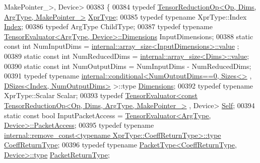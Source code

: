\begin{DoxyCode}
      MakePointer\_>, Device>
00383 \{
00384   \textcolor{keyword}{typedef} \hyperlink{class_eigen_1_1_tensor_reduction_op}{TensorReductionOp<Op, Dims, ArgType, MakePointer\_>}
       \hyperlink{class_eigen_1_1_tensor_reduction_op}{XprType};
00385   \textcolor{keyword}{typedef} \textcolor{keyword}{typename} XprType::Index \hyperlink{namespace_eigen_a62e77e0933482dafde8fe197d9a2cfde}{Index};
00386   \textcolor{keyword}{typedef} ArgType ChildType;
00387   \textcolor{keyword}{typedef} \textcolor{keyword}{typename} \hyperlink{struct_eigen_1_1_tensor_evaluator}{TensorEvaluator<ArgType, Device>::Dimensions}
       InputDimensions;
00388   \textcolor{keyword}{static} \textcolor{keyword}{const} \textcolor{keywordtype}{int} NumInputDims = \hyperlink{struct_eigen_1_1internal_1_1array__size}{internal::array\_size<InputDimensions>::value}
      ;
00389   \textcolor{keyword}{static} \textcolor{keyword}{const} \textcolor{keywordtype}{int} NumReducedDims = \hyperlink{struct_eigen_1_1internal_1_1array__size}{internal::array\_size<Dims>::value};
00390   \textcolor{keyword}{static} \textcolor{keyword}{const} \textcolor{keywordtype}{int} NumOutputDims = NumInputDims - NumReducedDims;
00391   \textcolor{keyword}{typedef} \textcolor{keyword}{typename} \hyperlink{struct_eigen_1_1internal_1_1conditional}{internal::conditional<NumOutputDims==0, Sizes<>}
      , \hyperlink{struct_eigen_1_1_d_sizes}{DSizes<Index, NumOutputDims>} >::type \hyperlink{class_eigen_1_1internal_1_1_tensor_lazy_evaluator_writable}{Dimensions};
00392   \textcolor{keyword}{typedef} \textcolor{keyword}{typename} XprType::Scalar Scalar;
00393   \textcolor{keyword}{typedef} 
      \hyperlink{struct_eigen_1_1_tensor_evaluator}{TensorEvaluator<const TensorReductionOp<Op, Dims, ArgType, MakePointer\_>}
      , Device> \hyperlink{struct_eigen_1_1_tensor_evaluator_3_01const_01_tensor_reduction_op_3_01_op_00_01_dims_00_01_arg_4fdf2ec1445de4704eb590bc98040dc6}{Self};
00394   \textcolor{keyword}{static} \textcolor{keyword}{const} \textcolor{keywordtype}{bool} InputPacketAccess = 
      \hyperlink{struct_eigen_1_1_tensor_evaluator}{TensorEvaluator<ArgType, Device>::PacketAccess};
00395   \textcolor{keyword}{typedef} \textcolor{keyword}{typename} 
      \hyperlink{group___sparse_core___module}{internal::remove\_const<typename XprType::CoeffReturnType>::type}
       \hyperlink{group___sparse_core___module}{CoeffReturnType};
00396   \textcolor{keyword}{typedef} \textcolor{keyword}{typename} \hyperlink{group___sparse_core___module}{PacketType<CoeffReturnType, Device>::type} 
      \hyperlink{group___sparse_core___module}{PacketReturnType};

\end{DoxyCode}
